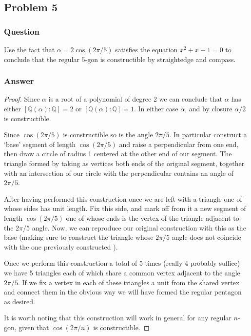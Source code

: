 \documentclass[10pt]{article}
\begin{document}
\subsection{Problem 5}
\subsubsection{Question}
Use the fact that $\alpha =2 \cos{(2\pi /5)}$ satisfies the equation $x^2+x-1=0$ to conclude that the regular $5$-gon is constructible by straightedge and compass.
\subsubsection{Answer}
\begin{proof}
Since $\alpha$ is a root of a polynomial of degree 2 we can conclude that $\alpha$ has either $[\mathbb{Q}(\alpha): \mathbb{Q}]=2$ or $[\mathbb{Q}(\alpha): \mathbb{Q}]=1$. In either case $\alpha$, and by closure $\alpha / 2$ is constructible.   

Since $\cos{(2 \pi / 5)}$ is constructible so is the angle $2 \pi / 5$. In particular construct a `base' segment of length $\cos{(2 \pi /5)}$ and raise a perpendicular from one end, then draw a circle of radius 1 centered at the other end of our segment. The triangle formed by taking as vertices both ends of the original segment, together with an intersection of our circle with the perpendicular contains an angle of $2 \pi / 5$.

After having performed this construction once we are left with a triangle one of whose sides has unit length. Fix this side, and mark off from it a new segment of length $\cos{(2 \pi / 5)}$ one of whose ends is the vertex of the triangle adjacent to the $2 \pi / 5$ angle. Now, we can reproduce our original construction with this as the base (making sure to construct the triangle whose $2 \pi / 5 $ angle does not coincide with the one previously constructed ).

Once we perform this construction a total of 5 times (really 4 probably suffice) we have 5 triangles each of which share a common vertex adjacent to the angle $2 \pi / 5$. If we fix a vertex in each of these triangles a unit from the shared vertex and connect them in the obvious way we will have formed the regular pentagon as desired.

It is worth noting that this construction will work in general for any regular $n$-gon, given that $\cos{(2 \pi / n)}$ is constructible.
\end{proof}
\end{document}
